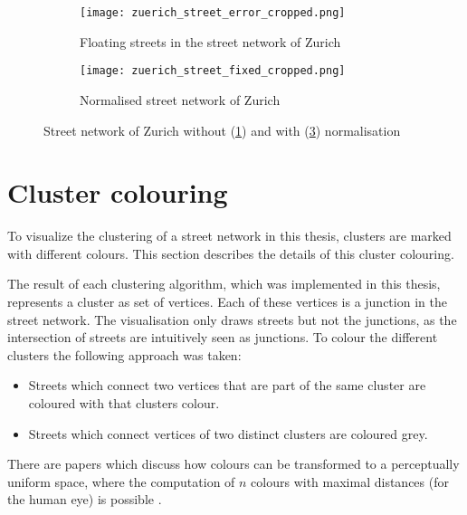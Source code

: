 \begin{figure}
    \centering
    \begin{subfigure}[b]{0.8\textwidth}
        \begin{mdframed}[style=mdthight]
            \texttt{[image: zuerich\_street\_error\_cropped.png]}
        \end{mdframed}
        \caption{Floating streets in the street network of Zurich}
        \label{fig:zuerich_error}
    \end{subfigure}
    \par\medskip
    \begin{subfigure}[b]{0.8\textwidth}
        \begin{mdframed}[style=mdthight]
            \texttt{[image: zuerich\_street\_fixed\_cropped.png]}
        \end{mdframed}
        \caption{Normalised street network of Zurich}
        \label{fig:zuerich_fixed}
    \end{subfigure}
    \caption{Street network of Zurich without (\ref{fig:zuerich_error}) and with (\ref{fig:zuerich_fixed}) normalisation}
\end{figure}

\section{Cluster colouring}
To visualize the clustering of a street network in this thesis, clusters are marked with different colours. This section describes the details of this cluster colouring.

The result of each clustering algorithm, which was implemented in this thesis, represents a cluster as set of vertices. Each of these vertices is a junction in the street network. The visualisation only draws streets but not the junctions, as the intersection of streets are intuitively seen as junctions. To colour the different clusters the following approach was taken:

\begin{itemize}
    \item Streets which connect two vertices that are part of the same cluster are coloured with that clusters colour.
    \item Streets which connect vertices of two distinct clusters are coloured grey.
\end{itemize}

There are papers which discuss how colours can be transformed to a perceptually uniform space, where the computation of $n$ colours with maximal distances (for the human eye) is possible \cite{colors:2006}.

